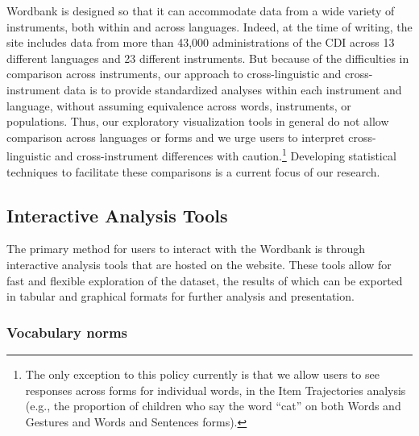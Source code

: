 \documentclass[man,noapacite]{apa}
\begin{document}
Wordbank is designed so that it can accommodate data from a wide variety of instruments, both within and across languages. Indeed, at the time of writing, the site includes data from more than 43,000 administrations of the CDI across 13 different languages and 23 different instruments. But because of the difficulties in comparison across instruments, our approach to cross-linguistic and cross-instrument data is to provide standardized analyses within each instrument and language, without assuming equivalence across words, instruments, or populations. Thus, our exploratory visualization tools in general do not allow comparison across languages or forms and we urge users to interpret cross-linguistic and cross-instrument differences with caution.\footnote{The only exception to this policy currently is that we allow users to see responses across forms for individual words, in the Item Trajectories analysis (e.g., the proportion of children who say the word ``cat'' on both Words and Gestures and Words and Sentences forms).} Developing statistical techniques to facilitate these comparisons is a current focus of our research. 

\subsection{Interactive Analysis Tools}

The primary method for users to interact with the Wordbank is through interactive analysis tools that are hosted on the website. These tools allow for fast and flexible exploration of the dataset, the results of which can be exported in tabular and graphical formats for further analysis and presentation. 

\subsubsection{Vocabulary norms}
\end{document}
